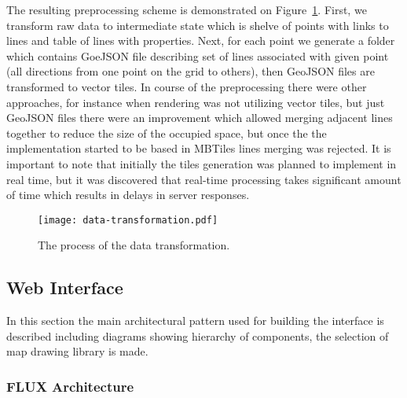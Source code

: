 The resulting preprocessing scheme is demonstrated on Figure~\ref{pic:transforming_data}.
First, we transform raw data to intermediate state which is shelve of points with links to lines
and table of lines with properties. Next, for each point we generate a folder which contains
GoeJSON file describing set of lines associated with given point (all directions from one point on the grid
to others), then GeoJSON files are transformed to vector tiles. In course of the preprocessing
there were other approaches, for instance when rendering was not utilizing vector tiles, but
just GeoJSON files there were an improvement which allowed merging adjacent lines together to reduce
the size of the occupied space, but once the the implementation started to be based in MBTiles lines
merging was rejected. It is important to note that initially the tiles generation was
planned to implement in real time, but it was discovered that real-time processing takes significant
amount of time which results in delays in server responses.

\begin{figure}[h]
  \centering
  \texttt{[image: data-transformation.pdf]}
  \caption{The process of the data transformation.}
  \label{pic:transforming_data}
\end{figure}

\subsection{Web Interface}

In this section the main architectural pattern used for building the interface is described
including diagrams showing hierarchy of components, the selection of map drawing library is made.

\subsubsection{FLUX Architecture}

